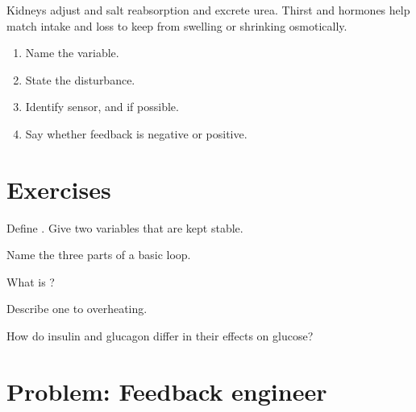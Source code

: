 \begin{proposition}\label{prop:g9:homeostasis:kidney}
Kidneys adjust  and salt reabsorption and excrete urea. Thirst and
hormones help match intake and loss to keep  from swelling or
shrinking osmotically.
\end{proposition}
\admitted

\begin{method}\label{met:g9:homeostasis:anal}
\begin{enumerate}
  \item Name the variable.
  \item State the disturbance.
  \item Identify sensor,  and  if possible.
  \item Say whether feedback is negative or positive.
\end{enumerate}
\end{method}

\section{Exercises}

\begin{exercise}[$\star$]\label{exo:g9:homeostasis:1}
Define . Give two variables that are kept stable.
\end{exercise}

\begin{exercise}[$\star$]\label{exo:g9:homeostasis:2}
Name the three parts of a basic  loop.
\end{exercise}

\begin{exercise}[$\star$]\label{exo:g9:homeostasis:3}
What is ?
\end{exercise}

\begin{exercise}[$\star$]\label{exo:g9:homeostasis:4}
Describe one  to overheating.
\end{exercise}

\begin{exercise}[$\star$]\label{exo:g9:homeostasis:5}
How do insulin and glucagon differ in their effects on  glucose?
\end{exercise}

\section{Problem: Feedback engineer}

